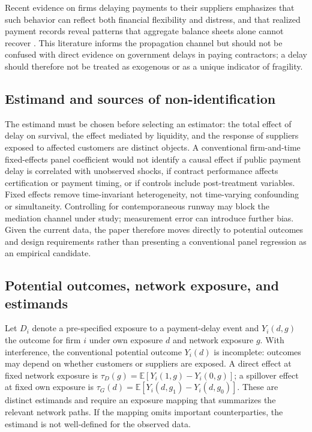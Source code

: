 \documentclass[11pt,a4paper]{article}
\begin{document}
Recent evidence on firms delaying payments to their suppliers emphasizes that such behavior can reflect both financial flexibility and distress, and that realized payment records reveal patterns that aggregate balance sheets alone cannot recover \citep{wu2026,hirshleifer2019}. This literature informs the propagation channel but should not be confused with direct evidence on government delays in paying contractors; a delay should therefore not be treated as exogenous or as a unique indicator of fragility.

\subsection{Estimand and sources of non-identification}
The estimand must be chosen before selecting an estimator: the total effect of delay on survival, the effect mediated by liquidity, and the response of suppliers exposed to affected customers are distinct objects. A conventional firm-and-time fixed-effects panel coefficient would not identify a causal effect if public payment delay is correlated with unobserved shocks, if contract performance affects certification or payment timing, or if controls include post-treatment variables. Fixed effects remove time-invariant heterogeneity, not time-varying confounding or simultaneity. Controlling for contemporaneous runway may block the mediation channel under study; measurement error can introduce further bias. Given the current data, the paper therefore moves directly to potential outcomes and design requirements rather than presenting a conventional panel regression as an empirical candidate.

\subsection{Potential outcomes, network exposure, and estimands}
Let $D_i$ denote a pre-specified exposure to a payment-delay event and $Y_i(d,g)$ the outcome for firm $i$ under own exposure $d$ and network exposure $g$. With interference, the conventional potential outcome $Y_i(d)$ is incomplete: outcomes may depend on whether customers or suppliers are exposed. A direct effect at fixed network exposure is $\tau_D(g)=\mathbb E[Y_i(1,g)-Y_i(0,g)]$; a spillover effect at fixed own exposure is $\tau_G(d)=\mathbb E[Y_i(d,g_1)-Y_i(d,g_0)]$. These are distinct estimands and require an exposure mapping that summarizes the relevant network paths. If the mapping omits important counterparties, the estimand is not well-defined for the observed data.
\end{document}
